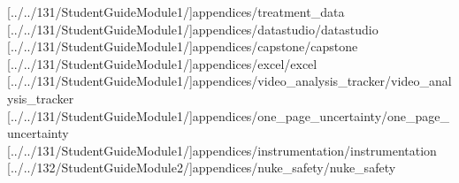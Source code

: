 \documentclass[english,twoside]{labmanual} %
\begin{document}
\cleardoublepage
\renewcommand{\section}{\NoExtraPageSection} %
\appendix

[../../131/StudentGuideModule1/]{appendices/treatment_data}
[../../131/StudentGuideModule1/]{appendices/datastudio/datastudio}
[../../131/StudentGuideModule1/]{appendices/capstone/capstone}
[../../131/StudentGuideModule1/]{appendices/excel/excel}
[../../131/StudentGuideModule1/]{appendices/video_analysis_tracker/video_analysis_tracker}
[../../131/StudentGuideModule1/]{appendices/one_page_uncertainty/one_page_uncertainty}
[../../131/StudentGuideModule1/]{appendices/instrumentation/instrumentation}
[../../132/StudentGuideModule2/]{appendices/nuke_safety/nuke_safety}
\end{document}
